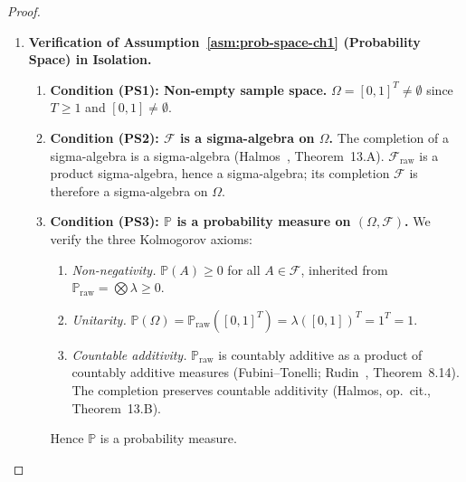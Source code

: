 \documentclass[12pt,openany]{book}
\newcommand{\calF}{\mathcal{F}}
\newcommand{\Prob}{\mathbb{P}}
\numberwithin{equation}{chapter}
\theoremstyle{plain}
\theoremstyle{definition}
\theoremstyle{remark}
\numberwithin{equation}{chapter}
\theoremstyle{plain}
\begin{document}
\begin{proof}
\begin{enumerate}[label=\textbf{Phase~\Roman*.}]
\begin{enumerate}[label=\textbf{Step~1.\arabic*.}]
  \item \textbf{Bucket count.}
        Define
        \begin{align}
          K &:= 6.
          \label{eq:cons-K}
        \end{align}
        This is a positive integer satisfying $K \geq 1$.

\end{enumerate}

\item \textbf{Verification of Assumption~\ref{asm:prob-space-ch1}
              (Probability Space) in Isolation.}

\begin{enumerate}[label=\textbf{Step~2.\arabic*.}]

  \item \textbf{Condition \textbf{(PS1)}: Non-empty sample space.}
        $\Omega = [0,1]^T \neq \emptyset$ since $T \geq 1$ and
        $[0,1] \neq \emptyset$.
        \hfill\checkmark

  \item \textbf{Condition \textbf{(PS2)}: $\calF$ is a sigma-algebra
        on $\Omega$.}
        The completion of a sigma-algebra is a sigma-algebra
        (Halmos~\cite{halmos1950}, Theorem~13.A).
        $\calF_{\mathrm{raw}}$ is a product sigma-algebra, hence a
        sigma-algebra; its completion $\calF$ is therefore a
        sigma-algebra on $\Omega$.
        \hfill\checkmark

  \item \textbf{Condition \textbf{(PS3)}: $\Prob$ is a probability
        measure on $(\Omega, \calF)$.}
        We verify the three Kolmogorov axioms:
        \begin{enumerate}[label=\textbf{(PS3.\alph*)}]
          \item \emph{Non-negativity.}
                $\Prob(A) \geq 0$ for all $A \in \calF$, inherited
                from $\Prob_{\mathrm{raw}} = \bigotimes \lambda \geq 0$.
          \item \emph{Unitarity.}
                $\Prob(\Omega) = \Prob_{\mathrm{raw}}([0,1]^T)
                = \lambda([0,1])^T = 1^T = 1$.
          \item \emph{Countable additivity.}
                $\Prob_{\mathrm{raw}}$ is countably additive as a
                product of countably additive measures (Fubini--Tonelli;
                Rudin~\cite{rudin1987}, Theorem~8.14).  The completion
                preserves countable additivity (Halmos, op.~cit.,
                Theorem~13.B).
        \end{enumerate}
        Hence $\Prob$ is a probability measure.
        \hfill\checkmark


\end{enumerate}
\end{enumerate}
\end{proof}
\end{document}
